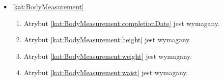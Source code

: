 \begin{itemize}[label={\textbf{Ograniczenia dla}}, wide, labelwidth=!, labelindent=0pt]

    \item\ref{kat:BodyMeasurement}\mynobreakpar
    \begin{enumerate}[label={\textbf{OGR/5/\protect\twodigits{\arabic{enumi}}}}, wide, labelwidth=!, align=left, leftmargin=3cm, resume]
        \item Atrybut \ref{kat:BodyMeasurement:completionDate} jest wymagany.
        \item Atrybut \ref{kat:BodyMeasurement:height} jest wymagany.
        \item Atrybut \ref{kat:BodyMeasurement:weight} jest wymagany.
        \item Atrybut \ref{kat:BodyMeasurement:waist} jest wymagany.


\end{enumerate}
\end{itemize}
